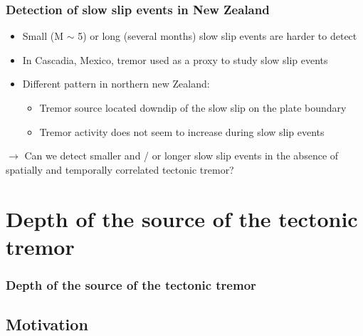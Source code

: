 \documentclass{beamer}
\begin{document}
	\begin{frame}
		\frametitle{Detection of slow slip events in New Zealand}
		\begin{itemize}
			\item Small (M $\sim$ 5) or long (several months) slow slip events are harder to detect
			\item In Cascadia, Mexico, tremor used as a proxy to study slow slip events
			\item Different pattern in northern new Zealand:
			\begin{itemize}
				\item Tremor source located downdip of the slow slip on the plate boundary
				\item Tremor activity does not seem to increase during slow slip events
			\end{itemize}
		\end{itemize}

		\begin{block}{}
			$\rightarrow$ Can we detect smaller and / or longer slow slip events in the absence of spatially and temporally correlated tectonic tremor?
		\end{block}			
	\end{frame}

				
	\section{Depth of the source of the tectonic tremor}

	\begin{frame}
		\frametitle{Depth of the source of the tectonic tremor}
	\end{frame}


	\subsection{Motivation}
\end{document}
